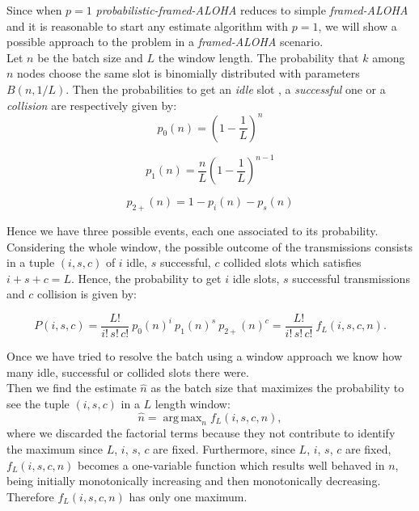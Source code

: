 \documentclass[11pt,a4paper,twoside,openright]{book}
\DeclareMathOperator*{\argmax}{arg\,max}
\newcommand{\fw}{f_{L}}
\begin{document}
Since when $p=1$ \emph{probabilistic-framed-ALOHA} reduces to simple \emph{framed-ALOHA} and it is reasonable to start any estimate algorithm with $p=1$, we will show a possible approach to the problem in a \emph{framed-ALOHA} scenario. \\

Let $n$ be the batch size and $L$ the window length. The probability that $k$ among $n$ nodes choose the same slot is binomially distributed with parameters $B(n,1/L)$. Then the probabilities to get an \emph{idle} slot , a \emph{successful} one or a \emph{collision} are respectively given by:
\begin{equation}
p_{0}(n)=\left(1-\frac{1}{L}\right)^{n}
\end{equation}

\begin{equation}
p_{1}(n)=\frac{n}{L}\left(1-\frac{1}{L}\right)^{n-1}
\end{equation}

\begin{equation}
p_{2+}(n)=1-p_{i}(n)-p_{s}(n)
\end{equation}

Hence we have three possible events, each one associated to its probability. Considering the whole window, the possible outcome of the transmissions consists in a tuple $(i,s,c)$ of  $i$ idle, $s$ successful, $c$ collided slots which satisfies $i+s+c=L$.
Hence, the probability to get $i$ idle slots, $s$ successful transmissions and $c$ collision is given by:

\begin{equation}
P(i,s,c)= \frac{L!}{i!\,s!\,c!} \ p_{0}(n)^{i} \ p_{1}(n)^{s}\ p_{2+}(n)^{c} = \frac{L!}{i!\,s!\,c!} \  \fw(i,s,c,n).
\label{eq:Pisc}
\end{equation}

Once we have tried to resolve the batch using a window approach we know how many idle, successful or collided slots there were.\\ Then we  find the estimate $\hat{n}$ as the batch size that  maximizes the probability to see the tuple $(i,s,c)$ in a $L$ length window:
\begin{equation}
\hat{n}=\argmax_{\displaystyle n} \fw(i,s,c,n),
\end{equation}
where we discarded the factorial terms because they not contribute to identify the maximum since $L$, $i$, $s$, $c$ are fixed. Furthermore, since $L$, $i$, $s$, $c$ are fixed, $\fw(i,s,c,n)$ becomes a one-variable function which results well behaved in $n$, being initially monotonically increasing and then monotonically decreasing. Therefore $\fw(i,s,c,n)$ has only one maximum.
\end{document}
